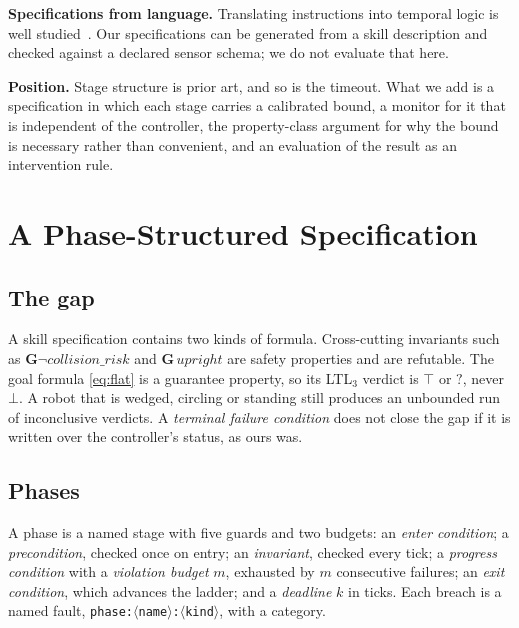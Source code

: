 \documentclass[letterpaper, 10pt, journal, twoside]{IEEEtran}
\newcommand{\G}{\mathbf{G}}
\begin{document}
\textbf{Specifications from language.} Translating instructions into
temporal logic is well
studied~\cite{liu2023grounding,chen2023nl2tl,fuggitti2023nl2ltl,sundarsingh2025conformalnl2ltl}.
Our specifications can be generated from a skill description and checked
against a declared sensor schema; we do not evaluate that here.

\textbf{Position.} Stage structure is prior art, and so is the timeout.
What we add is a specification in which each stage carries a calibrated
bound, a monitor for it that is independent of the controller, the
property-class argument for why the bound is necessary rather than
convenient, and an evaluation of the result as an intervention rule.

\section{A Phase-Structured Specification}
\label{sec:spec}

\subsection{The gap}

A skill specification contains two kinds of formula. Cross-cutting
invariants such as $\G\neg\mathit{collision\_risk}$ and
$\G\,\mathit{upright}$ are safety properties and are refutable. The goal
formula \eqref{eq:flat} is a guarantee property, so its LTL$_3$ verdict
is $\top$ or $?$, never $\bot$. A robot that is wedged, circling or
standing still produces an unbounded run of inconclusive verdicts. A
\emph{terminal failure condition} does not close the gap if it is
written over the controller's status, as ours was.

\subsection{Phases}

A phase is a named stage with five guards and two budgets: an
\emph{enter condition}; a \emph{precondition}, checked once on entry; an
\emph{invariant}, checked every tick; a \emph{progress condition} with a
\emph{violation budget} $m$, exhausted by $m$ consecutive failures; an
\emph{exit condition}, which advances the ladder; and a \emph{deadline}
$k$ in ticks. Each breach is a named fault,
\texttt{phase:$\langle$name$\rangle$:$\langle$kind$\rangle$}, with a
category.
\end{document}
